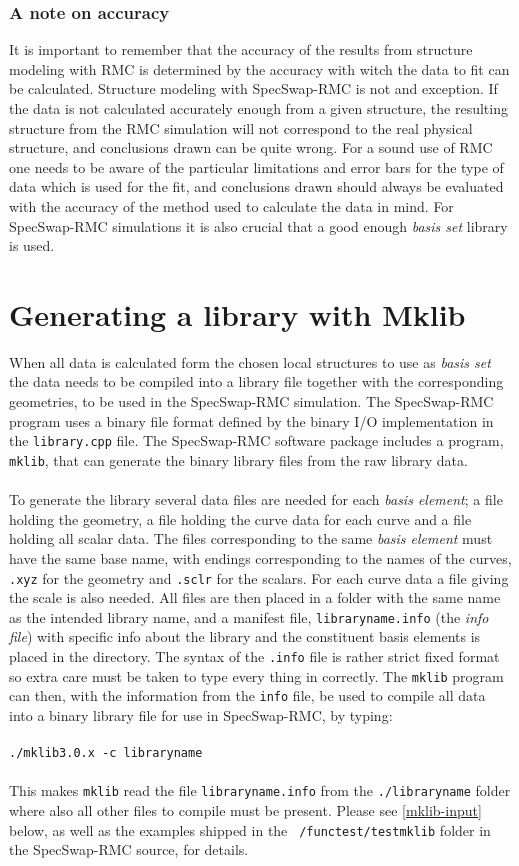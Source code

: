 \documentclass[a4paper, 10pt]{article}
\begin{document}
 \subsubsection{A note on accuracy}
It is important to remember that the accuracy of the results from
structure modeling with RMC is
determined by the accuracy with witch the data to fit can be
calculated.
Structure modeling with SpecSwap-RMC is not and exception. If
the data is not calculated accurately enough from a given structure,
the resulting structure from the RMC simulation will not correspond to
the real physical structure, and conclusions drawn
can be quite wrong. For a sound use of RMC one needs to be aware
of the particular limitations and error bars for the type of data
which is used for the fit, and conclusions drawn should always be
evaluated with the accuracy of the method used to
calculate the data in mind. For SpecSwap-RMC simulations it is also
crucial that a good enough {\it basis set} library is used.

\section{Generating a library with Mklib}
When all data is calculated form the chosen local structures to use as
{\it basis set} the data needs to be compiled into a library file together
with the corresponding geometries, to be used in the SpecSwap-RMC
simulation.  The SpecSwap-RMC program uses a binary file format
defined by the binary I/O
implementation in the {\tt library.cpp} file. The SpecSwap-RMC
software package includes a program,
{\tt mklib}, that can generate the binary library files from the raw
library data.
\\\\
To generate the library several data files are needed for each {\it basis element}; a file holding the geometry, a file holding the curve
data for each curve and a file holding all scalar data. The files
corresponding to the same {\it basis element} must have the same base
name, with endings corresponding to the names of the curves, {\tt .xyz} for
the geometry and {\tt .sclr} for the scalars. For each curve
data a file giving the scale is also needed. All files are then placed
in a folder with the same name as the intended library name, and a
manifest file, {\tt libraryname.info} (the {\it info file}) with
specific info about the library and the constituent basis elements is placed
in the directory. The syntax of the {\tt .info} file is rather strict
fixed format so extra care must be taken to type every thing in
correctly. The {\tt mklib} program can then, with the information from
the {\tt info} file, be used to compile all data into a binary library file
for use in SpecSwap-RMC, by typing:\\\\
{\tt ./mklib3.0.x  -c libraryname }\\\\
This makes {\tt mklib} read the file {\tt libraryname.info}
from the {\tt ./libraryname} folder where also all other files to
compile must be present. Please see \ref{mklib-input} below, as well as
the examples shipped in the {\tt
  /functest/testmklib} folder in the SpecSwap-RMC source, for details.
\end{document}
